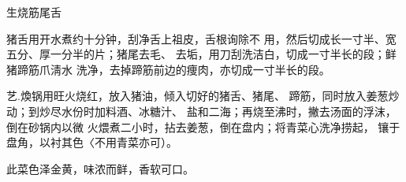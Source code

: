 \begin{recipe}{生烧筋尾舌}

\ingredients


\cooking

\step 猪舌用开水煮约十分钟，刮净舌上祖皮，舌根询除不 用，然后切成长一寸半、宽五分、厚一分半的片；猪尾去毛、 去垢，用刀刮洗洁白，切成一寸半长的段；鲜猪蹄筋爪淸水 洗净，去掉蹄筋前边的痩肉，亦切成一寸半长的段。

艺.煥锅用旺火烧红，放入猪油，倾入切好的猪舌、猪尾、 蹄筋，同时放入姜葱炒动；到炒尽水份时加料酒、冰糖汁、 盐和二海；再烧至沸时，撇去汤面的浮沫，倒在砂锅内以微 火煨煮二小时，拈去姜葱，倒在盘内；将青菜心洗净捞起， 镶于盘角，以衬其色〈不用青菜亦可）。

\notes

此菜色泽金黄，味浓而鲜，香软可口。

\end{recipe}

